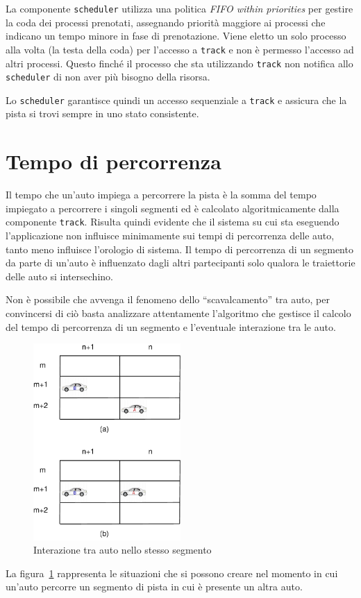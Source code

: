 \documentclass[a4paper]{report}
\begin{document}
La componente \texttt{scheduler} utilizza una politica \textit{FIFO within priorities} per gestire la coda dei processi prenotati, assegnando priorità maggiore ai processi che indicano un tempo minore in fase di prenotazione. Viene eletto un solo processo alla volta (la testa della coda) per l'accesso a \texttt{track} e non è permesso l'accesso ad altri processi. Questo finché il processo che sta utilizzando \texttt{track} non notifica allo \texttt{scheduler} di non aver più bisogno della risorsa.

Lo \texttt{scheduler} garantisce quindi un accesso sequenziale a \texttt{track} e assicura che la pista si trovi sempre in uno stato consistente.

\section{Tempo di percorrenza}
Il tempo che un'auto impiega a percorrere la pista è la somma del tempo impiegato a percorrere i singoli segmenti ed è calcolato algoritmicamente dalla componente \texttt{track}. Risulta quindi evidente che il sistema su cui sta eseguendo l'applicazione non influisce minimamente sui tempi di percorrenza delle auto, tanto meno influisce l'orologio di sistema. Il tempo di percorrenza di un segmento da parte di un'auto è influenzato dagli altri partecipanti solo qualora le traiettorie delle auto si intersechino.

Non è possibile che avvenga il fenomeno dello ``scavalcamento'' tra auto, per convincersi di ciò basta analizzare attentamente l'algoritmo che gestisce il calcolo del tempo di percorrenza di un segmento e l'eventuale interazione tra le auto.

\begin{figure}
\begin{center}
\includegraphics[width=0.5\textwidth]{diagrammi/Surpass}
\caption{Interazione tra auto nello stesso segmento}
\label{fig:surpass}
\end{center}
\end{figure}
La figura~\ref{fig:surpass} rappresenta le situazioni che si possono creare nel momento in cui un'auto percorre un segmento di pista in cui è presente un altra auto.
\end{document}
